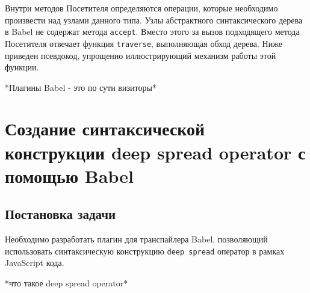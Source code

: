\documentclass[14pt, a4paper]{article}
\def\code#1{\texttt{#1}} %
\begin{document}
Внутри методов Посетителя определяются операции, которые необходимо произвести над узлами данного типа.
Узлы абстрактного синтаксического дерева в Babel не содержат метода \code{accept}. Вместо этого за вызов
подходящего метода Посетителя отвечает функция \code{traverse}, выполняющая обход дерева. Ниже приведен 
псевдокод, упрощенно иллюстрирующий механизм работы этой функции.



 *Плагины Babel - это по сути визиторы*

\pagebreak

\section{Создание синтаксической конструкции deep spread operator с помощью Babel}
\subsection{Постановка задачи}
Необходимо разработать плагин для транспайлера Babel, позволяющий использовать синтаксическую конструкцию
\code{deep spread} оператор в рамках JavaScript кода.

*что такое deep spread operator*
\end{document}

